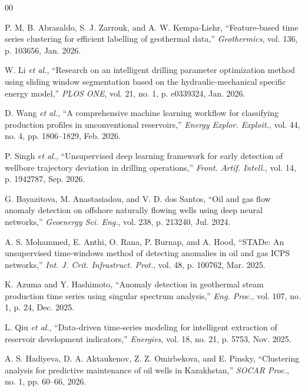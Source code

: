 \documentclass[conference]{IEEEtran}
\begin{document}
\begin{thebibliography}{00}

P. M. B. Abrasaldo, S. J. Zarrouk, and A. W. Kempa-Liehr, ``Feature-based time series clustering for efficient labelling of geothermal data,'' \textit{Geothermics}, vol. 136, p. 103656, Jan. 2026.

W. Li \textit{et al.}, ``Research on an intelligent drilling parameter optimization method using sliding window segmentation based on the hydraulic-mechanical specific energy model,'' \textit{PLOS ONE}, vol. 21, no. 1, p. e0339324, Jan. 2026.

D. Wang \textit{et al.}, ``A comprehensive machine learning workflow for classifying production profiles in unconventional reservoirs,'' \textit{Energy Explor. Exploit.}, vol. 44, no. 4, pp. 1806--1829, Feb. 2026.

P. Singh \textit{et al.}, ``Unsupervised deep learning framework for early detection of wellbore trajectory deviation in drilling operations,'' \textit{Front. Artif. Intell.}, vol. 14, p. 1942787, Sep. 2026.

G. Bayazitova, M. Anastasiadou, and V. D. dos Santos, ``Oil and gas flow anomaly detection on offshore naturally flowing wells using deep neural networks,'' \textit{Geoenergy Sci. Eng.}, vol. 238, p. 213240, Jul. 2024.

A. S. Mohammed, E. Anthi, O. Rana, P. Burnap, and A. Hood, ``STADe: An unsupervised time-windows method of detecting anomalies in oil and gas ICPS networks,'' \textit{Int. J. Crit. Infrastruct. Prot.}, vol. 48, p. 100762, Mar. 2025.

K. Azuma and Y. Hashimoto, ``Anomaly detection in geothermal steam production time series using singular spectrum analysis,'' \textit{Eng. Proc.}, vol. 107, no. 1, p. 24, Dec. 2025.

L. Qiu \textit{et al.}, ``Data-driven time-series modeling for intelligent extraction of reservoir development indicators,'' \textit{Energies}, vol. 18, no. 21, p. 5753, Nov. 2025.

A. S. Hadiyeva, D. A. Aktaukenov, Z. Z. Omirbekova, and E. Pinsky, ``Clustering analysis for predictive maintenance of oil wells in Kazakhstan,'' \textit{SOCAR Proc.}, no. 1, pp. 60--66, 2026.


\end{thebibliography}
\end{document}
